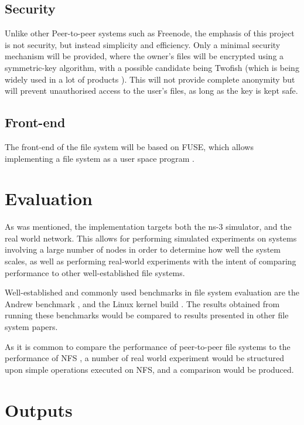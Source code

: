 \documentclass[8pt,a4paper]{article}
\begin{document}
\subsection{Security}

Unlike other Peer-to-peer systems such as Freenode, the emphasis of this project is not security, but instead simplicity and efficiency. Only a minimal security mechanism will be provided, where the owner's files will be encrypted using a symmetric-key algorithm, with a possible candidate being Twofish (which is being widely used in a lot of products \cite{twofishprod}).
This will not provide complete anonymity but will prevent unauthorised access to the user's files, as long as the key is kept safe.

\subsection{Front-end}

The front-end of the file system will be based on FUSE, which allows implementing a file system as a user space program \cite{fuse}.

\section{Evaluation}

As was mentioned, the implementation targets both the ns-3 \cite{ns3} simulator, and the real world network. This allows for performing simulated experiments on systems involving a large number of nodes in order to determine how well the system scales, as well as performing real-world experiments with the intent of comparing performance to other well-established file systems.

Well-established and commonly used benchmarks in file system evaluation are the Andrew benchmark \cite{andrew}, and the Linux kernel build \cite{kernelb}. The results obtained from running these benchmarks would be compared to results presented in other file system papers.

As it is common to compare the performance of peer-to-peer file systems to the performance of NFS \cite{pastis} \cite{ivy} \cite{oceanstore}, a number of real world experiment would be structured upon simple operations executed on NFS, and a comparison would be produced.

\section{Outputs}
\end{document}
